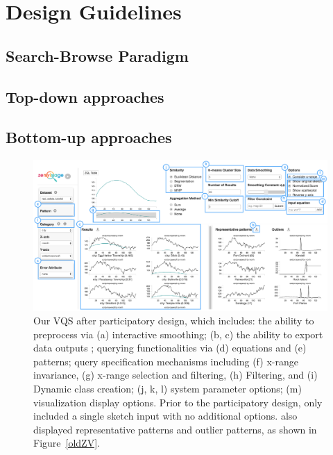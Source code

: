 \section{Design Guidelines\label{sec:guidelines}}

\subsection{Search-Browse Paradigm}

\subsection{Top-down approaches}
\subsection{Bottom-up approaches}

\begin{figure}[ht!]
\centering
\vspace{-15pt}
\includegraphics[width=\linewidth]{figures/newZV.pdf} %
\vspace{-5pt}\caption{Our VQS after participatory design, which includes: the ability to preprocess via (a) interactive smoothing; (b, c) the ability to export data outputs ; querying functionalities via (d) equations and (e) patterns; query specification mechanisms including (f) x-range invariance, (g) x-range selection and filtering, (h) Filtering, and (i) Dynamic class creation; (j, k, l) system parameter options; (m) visualization display options. Prior to the participatory design, \zv only included a single sketch input with no additional options. \zv also displayed representative patterns and outlier patterns, as shown in Figure~\ref{oldZV}.}
\label{zvOverview}
\vspace{-14pt}
\end{figure}



